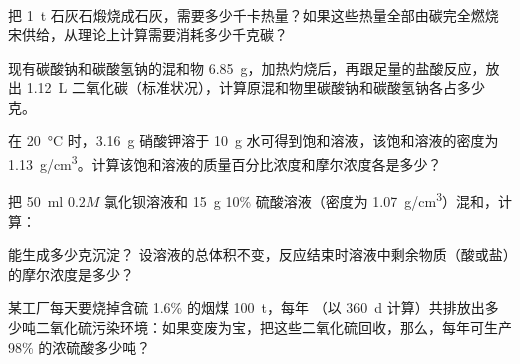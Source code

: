 \begin{Exercise}
\begin{question}
\begin{gather*}
    \end{gather*}
    把 \qty{1}{t} 石灰石煅烧成石灰，需要多少千卡热量？如果这些热量全部由碳完全燃烧宋供给，从理论上计算需要消耗多少千克碳？
    \item 现有碳酸钠和碳酸氢钠的混和物 \qty{6.85}{g}，加热灼烧后，再跟足量的盐酸反应，放出 \qty{1.12}{L} 二氧化碳（标准状况），计算原混和物里碳酸钠和碳酸氢钠各占多少克。
    \item 在 \qty{20}{\celsius} 时，\qty{3.16}{g} 硝酸钾溶于 \qty{10}{g} 水可得到饱和溶液，该饱和溶液的密度为 \qty{1.13}{g/cm^3}。计算该饱和溶液的质量百分比浓度和摩尔浓度各是多少？
    \item 把 \qty{50}{ml} $0.2M$ 氯化钡溶液和 \qty{15}{g} 10\% 硫酸溶液（密度为 \qty{1.07}{g/cm^3}）混和，计算：
    \begin{tasks}[label=(\arabic*)]
      \task 能生成多少克沉淀？
      \task 设溶液的总体积不变，反应结束时溶液中剩余物质（酸或盐）的摩尔浓度是多少？
    \end{tasks}
    \item 某工厂每天要烧掉含硫 1.6\% 的烟煤 \qty{100}{t}，每年 （以 \qty{360}{d} 计算）共排放出多少吨二氧化硫污染环境：如果变废为宝，把这些二氧化硫回收，那么，每年可生产 98\% 的浓硫酸多少吨？
  \end{question}
\end{Exercise}